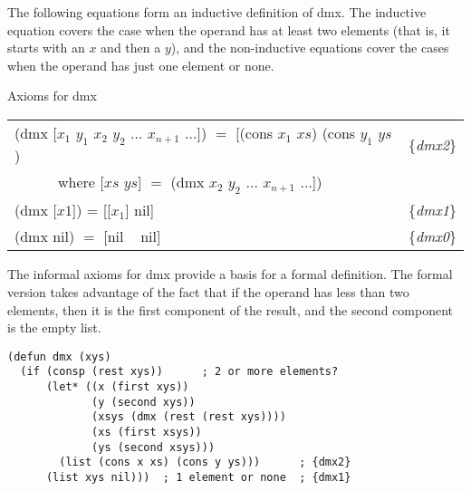 The following equations form an inductive definition of dmx.
The inductive equation covers the case when
the operand has at least two elements
(that is, it starts with an $x$ and then a $y$),
and the non-inductive equations cover the cases
when the operand has just one element or none.

\begin{center}
Axioms for dmx
\begin{tabular}{ll}
(dmx [$x_1$ $y_1$ $x_2$ $y_2$ $\dots$ $x_{n+1}$ $\dots$]) $=$ [(cons $x_1$ $xs$) (cons $y_1$ $ys$) &\{\emph{dmx2}\} \\
~~~~~~where [$xs$ $ys$] $=$ (dmx $x_2$ $y_2$ $\dots$ $x_{n+1}$ $\dots$])                           &\\
(dmx [$x1$]) =  [[$x_1$] nil]                                                                      &\{\emph{dmx1}\} \\
(dmx nil) $=$ [nil ~ nil]                                                                          &\{\emph{dmx0}\} \\
\end{tabular}
\end{center}

The informal axioms for dmx provide a basis for a formal definition.
The formal version takes advantage of the fact that if the operand
has less than two elements, then it is the first component of the result,
and the second component is the empty list.

\label{dmx-defun}
\begin{Verbatim}
(defun dmx (xys)
  (if (consp (rest xys))      ; 2 or more elements?
      (let* ((x (first xys))
             (y (second xys))
             (xsys (dmx (rest (rest xys))))
             (xs (first xsys))
             (ys (second xsys)))
        (list (cons x xs) (cons y ys)))      ; {dmx2}
      (list xys nil)))  ; 1 element or none  ; {dmx1}
\end{Verbatim}

